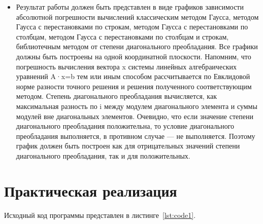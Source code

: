 \documentclass[a4paper, 14pt]{extarticle}
\begin{document}
\begin{itemize}
    \item Результат работы должен быть представлен в виде графиков зависимости абсолютной погрешности вычислений классическим методом Гаусса, методом Гаусса с перестановками по строкам, методом Гаусса с перестановками по столбцам, методом Гаусса с перестановками по столбцам и строкам, библиотечным методом от степени диагонального преобладания. Все графики должны быть построены на одной координатной плоскости. Напомним, что погрешность вычисления вектора x системы линейных алгебраических уравнений A·x=b тем или иным способом рассчитывается по Евклидовой норме разности точного решения и решения полученного соответствующим методом. Степень диагонального преобладания вычисляется, как максимальная разность по i между модулем диагонального элемента и суммы модулей вне диагональных элементов. Очевидно, что если значение степени диагонального преобладания положительна, то условие диагонального преобладания выполняется, в противном случае — не выполняется. Поэтому график должен быть построен как для отрицательных значений степени диагонального преобладания, так и для положительных.
\end{itemize}

\section{Практическая реализация}\label{Sect::code}

Исходный код программы представлен в листинге~\ref{lst:code1}.
\end{document}
